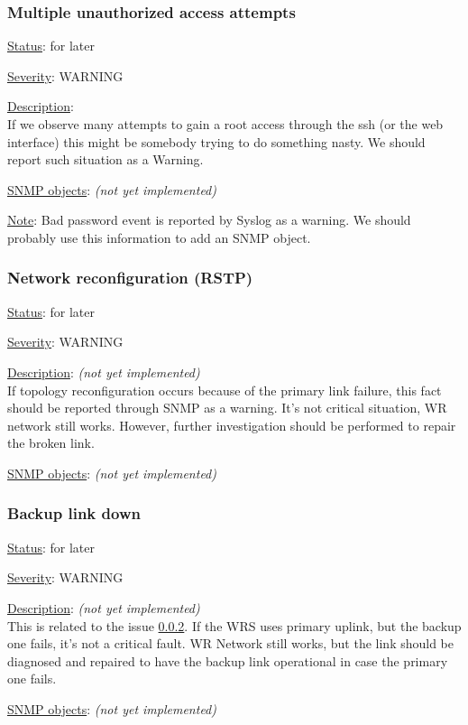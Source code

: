 \subsubsection{\bf Multiple unauthorized access attempts}
		\begin{packed_enum}
			\item [] \underline{Status}: for later
			\item [] \underline{Severity}: WARNING
			\item [] \underline{Description}:\\
				If we observe many attempts to gain a root access through the ssh (or
				the web interface) this might be somebody trying to do something nasty.
				We should report such situation as a Warning.
			\item [] \underline{SNMP objects}: \emph{(not yet implemented)}
			\item [] \underline{Note}: Bad password event is reported by Syslog as a
				warning. We should probably use this information to add an SNMP object.
		\end{packed_enum}

\subsubsection{\bf Network reconfiguration (RSTP)}
		\label{fail:other:rstp}
		\begin{packed_enum}
			\item [] \underline{Status}: for later
			\item [] \underline{Severity}: WARNING
			\item [] \underline{Description}: \emph{(not yet implemented)}\\
				If topology reconfiguration occurs because of the primary link failure,
				this fact should be reported through SNMP as a warning. It's not
				critical situation, WR network still works. However, further
				investigation should be performed to repair the broken link.
			\item [] \underline{SNMP objects}: \emph{(not yet implemented)}
		\end{packed_enum}

\subsubsection{\bf Backup link down}
		\begin{packed_enum}
			\item [] \underline{Status}: for later
			\item [] \underline{Severity}: WARNING
			\item [] \underline{Description}: \emph{(not yet implemented)}\\
				This is related to the issue \ref{fail:other:rstp}. If the WRS uses
				primary uplink, but the backup one fails, it's not a critical fault. WR
				Network still works, but the link should be diagnosed and repaired to
				have the backup link operational in case the primary one fails.
			\item [] \underline{SNMP objects}: \emph{(not yet implemented)}
		\end{packed_enum}

